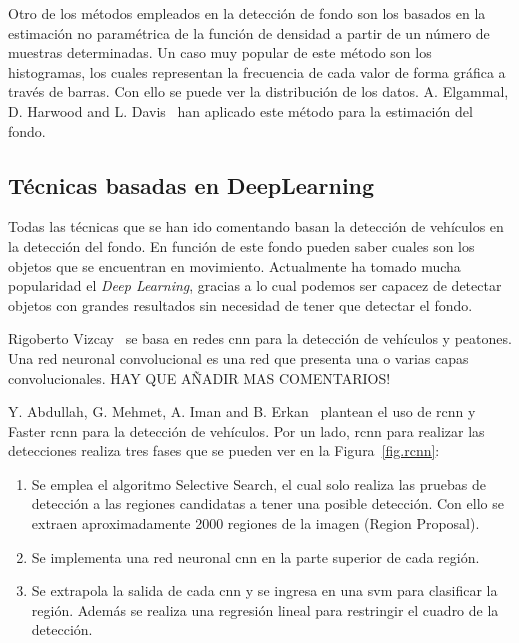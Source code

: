 Otro de los métodos empleados en la detección de fondo son los basados en la estimación no paramétrica de la función de densidad a partir de un número de muestras determinadas. Un caso muy popular de este método son los histogramas, los cuales representan la frecuencia de cada valor de forma gráfica a través de barras. Con ello se puede ver la distribución de los datos. A. Elgammal, D. Harwood and L. Davis~\cite{non_parametric_model} han aplicado este método para la estimación del fondo. 

\subsection{Técnicas basadas en DeepLearning}

Todas las técnicas que se han ido comentando basan la detección de vehículos en la detección del fondo. En función de este fondo pueden saber cuales son los objetos que se encuentran en movimiento. Actualmente ha tomado mucha popularidad el \textit{Deep Learning}, gracias a lo cual podemos ser capacez de detectar objetos con grandes resultados sin necesidad de tener que detectar el fondo. 

Rigoberto Vizcay~\cite{tesis_rigoberto} se basa en redes \acrfull{cnn} para la detección de vehículos y peatones. Una red neuronal convolucional es una red que presenta una o varias capas convolucionales. HAY QUE AÑADIR MAS COMENTARIOS!

Y. Abdullah, G. Mehmet, A. Iman and B. Erkan~\cite{rcnn_detection}  plantean el uso de \acrfull{rcnn} y Faster \acrshort{rcnn} para la detección de vehículos. Por un lado, \acrshort{rcnn} para realizar las detecciones realiza tres fases que se pueden ver en la Figura~\ref{fig.rcnn}:
\begin{enumerate}
    \item Se emplea el algoritmo Selective Search, el cual solo realiza las pruebas de detección a las regiones candidatas a tener una posible detección. Con ello se extraen aproximadamente 2000 regiones de la imagen (Region Proposal).
    \item Se implementa una red neuronal \acrfull{cnn} en la parte superior de cada región.
    \item Se extrapola la salida de cada \acrshort{cnn} y se ingresa en una \acrfull{svm} para clasificar la región. Además se realiza una regresión lineal para restringir el cuadro de la detección.
\end{enumerate}

